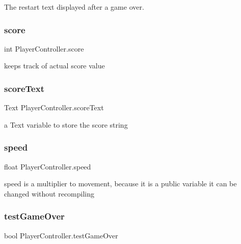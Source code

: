 The restart text displayed after a game over. 

\mbox{\label{class_player_controller_ac4f30954818a6c7d0e344721a0342fec}} 
\subsubsection{\texorpdfstring{score}{score}}
{\footnotesize\ttfamily int Player\+Controller.\+score}



keeps track of actual score value 

\mbox{\label{class_player_controller_a8f1361a4354591db4e79c4e6609e0a88}} 
\subsubsection{\texorpdfstring{scoreText}{scoreText}}
{\footnotesize\ttfamily Text Player\+Controller.\+score\+Text}



a Text variable to store the score string 

\mbox{\label{class_player_controller_a0928605583f0563cd84fe43119d336ec}} 
\subsubsection{\texorpdfstring{speed}{speed}}
{\footnotesize\ttfamily float Player\+Controller.\+speed}



speed is a multiplier to movement, because it is a public variable it can be changed without recompiling 

\mbox{\label{class_player_controller_a96474cb76d48047171329a05522f12a3}} 
\subsubsection{\texorpdfstring{testGameOver}{testGameOver}}
{\footnotesize\ttfamily bool Player\+Controller.\+test\+Game\+Over}

